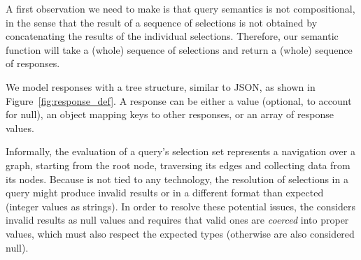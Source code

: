 A first observation we need to make is that query semantics is not compositional, in the sense that the result of a sequence of selections is not obtained by concatenating the results of the individual selections. Therefore, our semantic function will take a (whole) sequence of selections and return a (whole) sequence of responses.  

We model responses with a tree structure, similar to JSON, as shown in Figure~\ref{fig:response_def}. A response can be either a value (optional, to account for null), an object mapping keys to other responses, or an array of response values. 


%









Informally, the evaluation of a query's selection set represents a navigation over a graph, starting from the root node, traversing its edges and collecting data from its nodes. %
Because \gql is not tied to any technology, the resolution of selections in a query might produce invalid results or in a different format than expected (\eg integer values as strings). 
In order to resolve these potential issues, the \spec considers invalid results as null values and 
requires that valid ones are \emph{coerced} into proper values, which must also respect the expected types (otherwise are also considered null).

